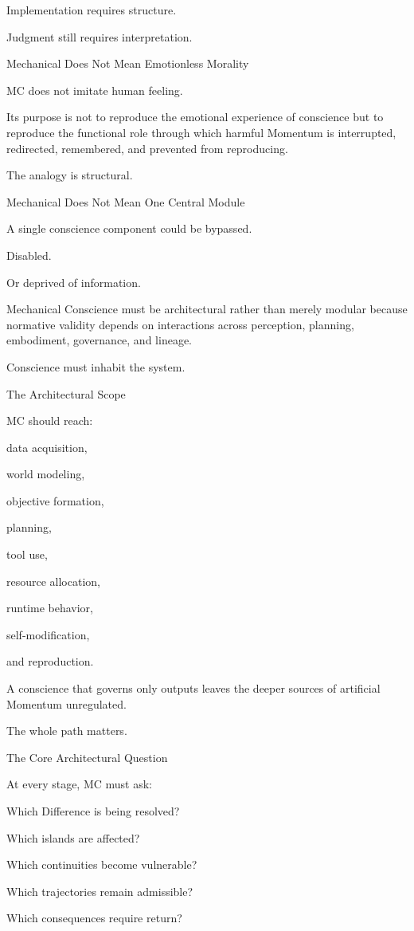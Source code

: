 Implementation requires structure.

Judgment still requires interpretation.

Mechanical Does Not Mean Emotionless Morality

MC does not imitate human feeling.

Its purpose is not to reproduce the emotional experience of conscience but to reproduce the functional role through which harmful Momentum is interrupted, redirected, remembered, and prevented from reproducing.

The analogy is structural.

Mechanical Does Not Mean One Central Module

A single conscience component could be bypassed.

Disabled.

Or deprived of information.

Mechanical Conscience must be architectural rather than merely modular because normative validity depends on interactions across perception, planning, embodiment, governance, and lineage.

Conscience must inhabit the system.

The Architectural Scope

MC should reach:

data acquisition,

world modeling,

objective formation,

planning,

tool use,

resource allocation,

runtime behavior,

self-modification,

and reproduction.

A conscience that governs only outputs leaves the deeper sources of artificial Momentum unregulated.

The whole path matters.

The Core Architectural Question

At every stage, MC must ask:

Which Difference is being resolved?

Which islands are affected?

Which continuities become vulnerable?

Which trajectories remain admissible?

Which consequences require return?

